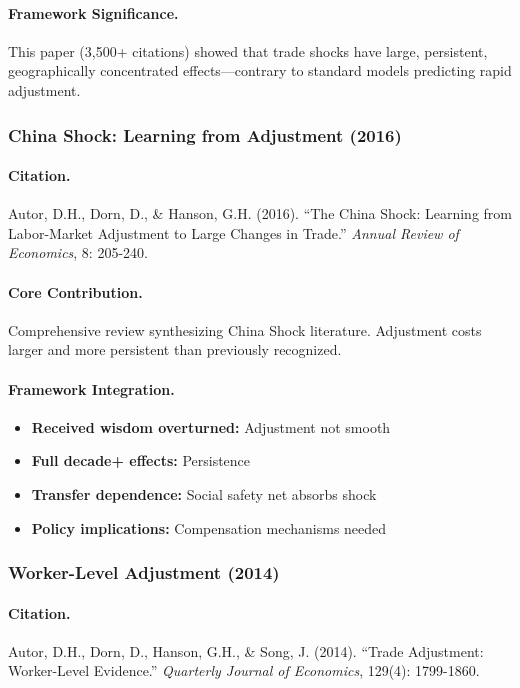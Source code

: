 \paragraph{Framework Significance.}
This paper (3,500+ citations) showed that trade shocks have large,
persistent, geographically concentrated effects---contrary to standard
models predicting rapid adjustment.

\subsubsection{China Shock: Learning from Adjustment (2016)}

\paragraph{Citation.}
Autor, D.H., Dorn, D., \& Hanson, G.H. (2016). ``The China Shock:
Learning from Labor-Market Adjustment to Large Changes in Trade.''
\emph{Annual Review of Economics}, 8: 205-240.

\paragraph{Core Contribution.}
Comprehensive review synthesizing China Shock literature. Adjustment
costs larger and more persistent than previously recognized.

\paragraph{Framework Integration.}
\begin{itemize}
  \item \textbf{Received wisdom overturned:} Adjustment not smooth
  \item \textbf{Full decade+ effects:} Persistence
  \item \textbf{Transfer dependence:} Social safety net absorbs shock
  \item \textbf{Policy implications:} Compensation mechanisms needed
\end{itemize}

\subsubsection{Worker-Level Adjustment (2014)}

\paragraph{Citation.}
Autor, D.H., Dorn, D., Hanson, G.H., \& Song, J. (2014). ``Trade
Adjustment: Worker-Level Evidence.''
\emph{Quarterly Journal of Economics}, 129(4): 1799-1860.

